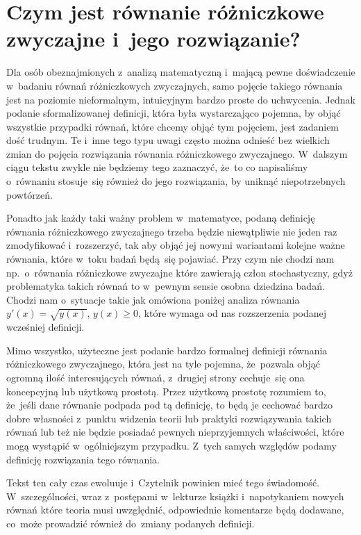 \documentclass[a4paper,11pt]{article}
\numberwithin{equation}{section}
\begin{document}
\section{Czym jest równanie różniczkowe zwyczajne i~jego
  rozwiązanie?}

\label{sec:Czym-jest-rownanie-ETC}



Dla osób obeznajmionych z~analizą matematyczną i~mającą pewne doświadczenie
w~badaniu równań różniczkowych zwyczajnych, samo pojęcie takiego równania
jest na poziomie nieformalnym, intuicyjnym bardzo proste do uchwycenia.
Jednak podanie sformalizowanej definicji, która była wystarczająco pojemna,
by objąć wszystkie przypadki równań, które chcemy objąć tym pojęciem, jest
zadaniem dość trudnym. Te i~inne tego typu uwagi często można odnieść bez
wielkich zmian do pojęcia rozwiązania równania różniczkowego zwyczajnego.
W~dalszym ciągu tekstu zwykle nie będziemy tego zaznaczyć, że~to co
napisaliśmy o~równaniu stosuje~się również do jego rozwiązania, by uniknąć
niepotrzebnych powtórzeń.

Ponadto jak każdy taki ważny problem w~matematyce, podaną definicję
równania różniczkowego zwyczajnego trzeba będzie niewątpliwie nie jeden raz
zmodyfikować i~rozszerzyć, tak aby objąć jej nowymi wariantami kolejne ważne
równania, które w~toku badań będą~się
pojawiać. Przy czym nie chodzi nam np.~o~równania różniczkowe zwyczajne
które
zawierają człon stochastyczny, gdyż problematyka takich równań to w~pewnym
sensie osobna dziedzina badań. Chodzi nam o~sytuacje takie jak omówiona
poniżej analiza równania $y'( x ) = \sqrt{ y( x ) }$, $y( x ) \geq 0$, które
wymaga od nas rozszerzenia podanej wcześniej definicji.

Mimo wszystko, użyteczne jest podanie bardzo formalnej definicji równania
różniczkowego zwyczajnego, która jest na tyle pojemna, że~pozwala objąć
ogromną ilość interesujących równań, z~drugiej strony cechuje~się ona
koncepcyjną lub użytkową prostotą. Przez użytkową prostotę rozumiem to,
że~jeśli dane równanie podpada pod tą definicję, to będą je
cechować bardzo dobre własności z~punktu widzenia teorii lub praktyki
rozwiązywania takich równań lub też nie będzie posiadać pewnych
nieprzyjemnych właściwości, które mogą wystąpić w~ogólniejszym przypadku.
Z~tych samych względów podamy definicję rozwiązania tego równania.

Tekst ten cały czas ewoluuje i~Czytelnik powinien mieć tego świadomość.
W~szczególności, wraz z~postępami w~lekturze książki i~napotykaniem nowych
równań które teoria musi uwzględnić, odpowiednie komentarze będą dodawane,
co~może prowadzić również do~zmiany podanych definicji.
\end{document}

